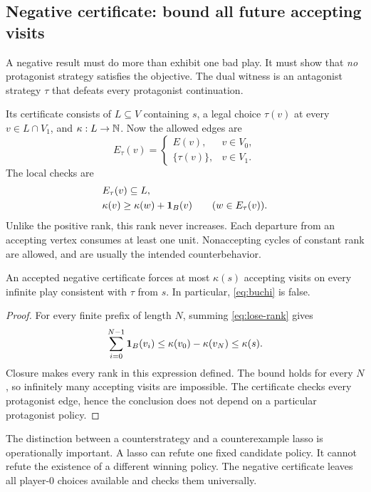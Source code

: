 \subsection{Negative certificate: bound all future accepting visits}
A negative result must do more than exhibit one bad play. It must show that
\emph{no} protagonist strategy satisfies the objective. The dual witness is an
antagonist strategy $\tau$ that defeats every protagonist continuation.

Its certificate consists of $L\subseteq V$ containing $s$, a legal choice
$\tau(v)$ at every $v\in L\cap V_1$, and $\kappa:L\to\mathbb{N}$. Now the allowed
edges are
\[
 E_\tau(v)=
 \begin{cases}
  E(v),&v\in V_0,\\
  \{\tau(v)\},&v\in V_1.
 \end{cases}
\]
The local checks are
\begin{align}
 &E_\tau(v)\subseteq L,\label{eq:lose-closed}\\
 &\kappa(v)\geq\kappa(w)+\mathbf{1}_B(v)
       \qquad(w\in E_\tau(v)).\label{eq:lose-rank}
\end{align}
Unlike the positive rank, this rank never increases. Each departure from an
accepting vertex consumes at least one unit. Nonaccepting cycles of constant
rank are allowed, and are usually the intended counterbehavior.

\begin{theorem}
\label{thm:cobuchi-rank}
An accepted negative certificate forces at most $\kappa(s)$ accepting visits
on every infinite play consistent with $\tau$ from $s$. In particular,
\eqref{eq:buchi} is false.
\end{theorem}
\begin{proof}
For every finite prefix of length $N$, summing \eqref{eq:lose-rank} gives
\[
 \sum_{i=0}^{N-1}\mathbf{1}_B(v_i)
 \leq \kappa(v_0)-\kappa(v_N)
 \leq \kappa(s).
\]
Closure makes every rank in this expression defined. The bound holds for every
$N$, so infinitely many accepting visits are impossible. The certificate
checks every protagonist edge, hence the conclusion does not depend on a
particular protagonist policy.
\end{proof}

The distinction between a counterstrategy and a counterexample lasso is
operationally important. A lasso can refute one fixed candidate policy. It
cannot refute the existence of a different winning policy. The negative
certificate leaves all player-0 choices available and checks them universally.


